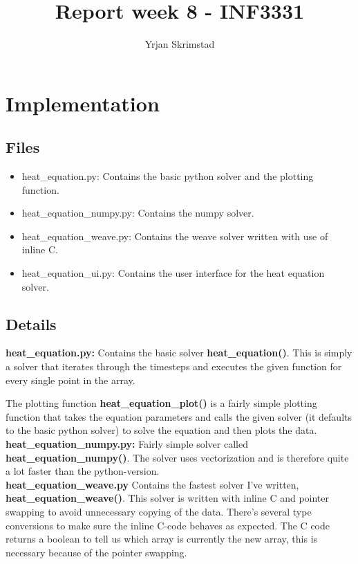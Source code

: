 \documentclass[]{article}
\title{Report week 8 - INF3331}
\author{Yrjan Skrimstad}
\begin{document}
\maketitle
\section{Implementation}
\subsection{Files}
\begin{itemize}
	\item heat\_equation.py: Contains the basic python solver and the plotting
		function.
	\item heat\_equation\_numpy.py: Contains the numpy solver.
	\item heat\_equation\_weave.py: Contains the weave solver written with use
		of inline C.
	\item heat\_equation\_ui.py: Contains the user interface for the heat
		equation solver.
\end{itemize}
\subsection{Details}
\textbf{heat\_equation.py:}
Contains the basic solver \textbf{heat\_equation()}. This is simply a solver
that iterates through the timesteps and executes the given function for every
single point in the array.

The plotting function \textbf{heat\_equation\_plot()}
is a fairly simple plotting function that takes the equation parameters and
calls the given solver (it defaults to the basic python solver) to solve the
equation and then plots the data.\\

\noindent\textbf{heat\_equation\_numpy.py:}
Fairly simple solver called \textbf{heat\_equation\_numpy()}. The
solver uses vectorization and is therefore quite a lot faster than the
python-version.\\

\noindent\textbf{heat\_equation\_weave.py}
Contains the fastest solver I've written, \\\textbf{heat\_equation\_weave()}.
This solver is written with inline C and pointer swapping to avoid unnecessary
copying of the data. There's several type conversions to make sure the inline
C-code behaves as expected. The C code returns a boolean to tell us which array
is currently the new array, this is necessary because of the pointer swapping.\\
\end{document}
